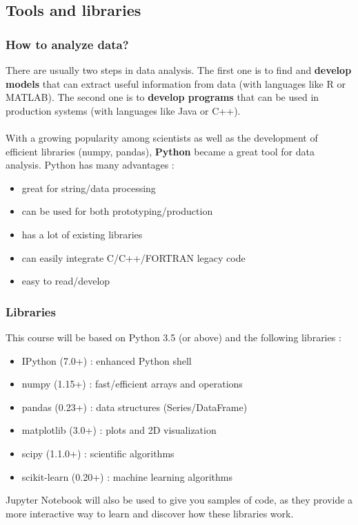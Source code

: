 \documentclass{beamer}
\begin{document}
\subsection{Tools and libraries}
\begin{frame}
  \frametitle{How to analyze data?}
  There are usually two steps in data analysis. The first one is to find and
  \textbf{develop models} that can extract useful information from data (with
  languages like R or MATLAB). The second one is to \textbf{develop programs}
  that can be used in production systems (with languages like Java or C++).
  \\~\\

  With a growing popularity among scientists as well as the development of
  efficient libraries (numpy, pandas), \textbf{Python} became a great tool for
  data analysis. Python has many advantages :
  \begin{itemize}
    \item great for string/data processing
    \item can be used for both prototyping/production
    \item has a lot of existing libraries
    \item can easily integrate C/C++/FORTRAN legacy code
    \item easy to read/develop
  \end{itemize}
\end{frame}

\begin{frame}
  \frametitle{Libraries}
  This course will be based on Python 3.5 (or above) and the following
  libraries :
  \begin{itemize}
    \item IPython (7.0+) : enhanced Python shell
    \item numpy (1.15+) : fast/efficient arrays and operations
    \item pandas (0.23+) : data structures (Series/DataFrame)
    \item matplotlib (3.0+) : plots and 2D visualization
    \item scipy (1.1.0+) : scientific algorithms
    \item scikit-learn (0.20+) : machine learning algorithms
  \end{itemize}

  Jupyter Notebook will also be used to give you samples of code, as they
  provide a more interactive way to learn and discover how these libraries
  work.
\end{frame}
\end{document}
